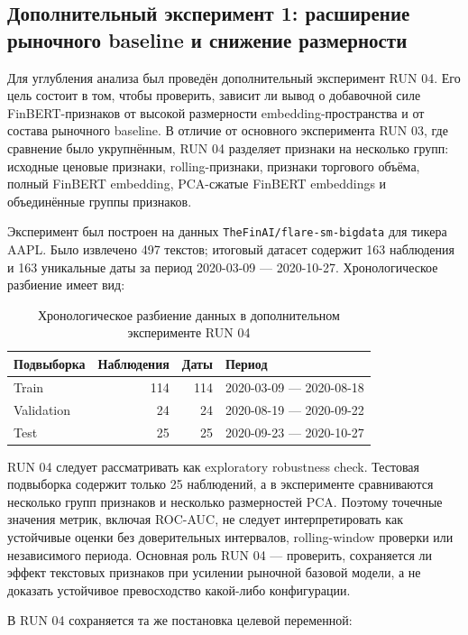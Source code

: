 \subsection{Дополнительный эксперимент 1: расширение рыночного baseline и снижение размерности}

Для углубления анализа был проведён дополнительный эксперимент RUN 04. Его цель состоит в том, чтобы проверить, зависит ли вывод о добавочной силе FinBERT-признаков от высокой размерности embedding-пространства и от состава рыночного baseline. В отличие от основного эксперимента RUN 03, где сравнение было укрупнённым, RUN 04 разделяет признаки на несколько групп: исходные ценовые признаки, rolling-признаки, признаки торгового объёма, полный FinBERT embedding, PCA-сжатые FinBERT embeddings и объединённые группы признаков.

Эксперимент был построен на данных \texttt{TheFinAI/flare-sm-bigdata} для тикера AAPL. Было извлечено 497 текстов; итоговый датасет содержит 163 наблюдения и 163 уникальные даты за период 2020-03-09 --- 2020-10-27. Хронологическое разбиение имеет вид:

\begin{table}[htbp]
\centering
\begin{tabular}{lrrl}
\toprule
Подвыборка & Наблюдения & Даты & Период \\
\midrule
Train & 114 & 114 & 2020-03-09 --- 2020-08-18 \\
Validation & 24 & 24 & 2020-08-19 --- 2020-09-22 \\
Test & 25 & 25 & 2020-09-23 --- 2020-10-27 \\
\bottomrule
\end{tabular}
\caption{Хронологическое разбиение данных в дополнительном эксперименте RUN 04}
\label{tab:run04_split}
\end{table}

RUN 04 следует рассматривать как exploratory robustness check. Тестовая подвыборка содержит только 25 наблюдений, а в эксперименте сравниваются несколько групп признаков и несколько размерностей PCA. Поэтому точечные значения метрик, включая ROC-AUC, не следует интерпретировать как устойчивые оценки без доверительных интервалов, rolling-window проверки или независимого периода. Основная роль RUN 04 --- проверить, сохраняется ли эффект текстовых признаков при усилении рыночной базовой модели, а не доказать устойчивое превосходство какой-либо конфигурации.

В RUN 04 сохраняется та же постановка целевой переменной:

